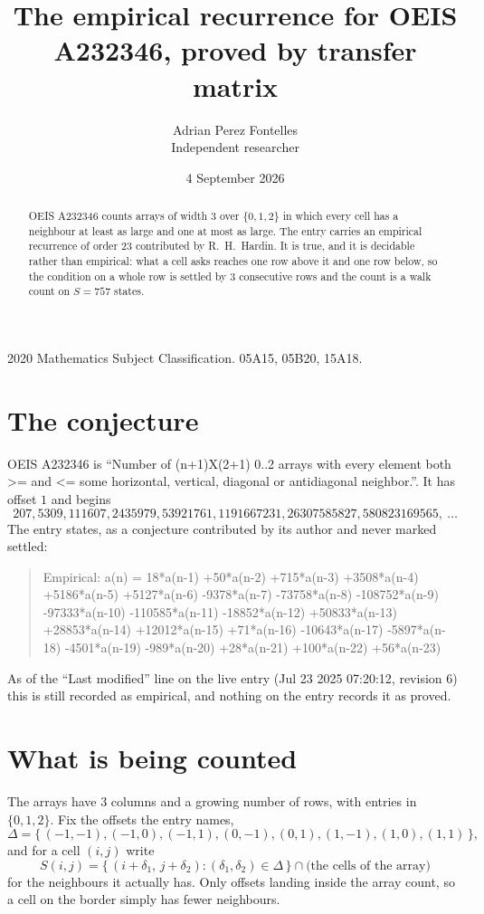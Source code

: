 \documentclass[11pt,a4paper]{article}
\title{The empirical recurrence for OEIS A232346, proved by transfer matrix}
\author{Adrian Perez Fontelles\\ \small Independent researcher}
\date{4 September 2026}
\theoremstyle{plain}
\theoremstyle{definition}
\begin{document}
\maketitle

\begin{abstract}
OEIS A232346 counts arrays of width $3$ over $\{0,1,2\}$ in which every cell has a neighbour at least as large and one at most as large. The entry carries an
empirical recurrence of order $23$ contributed by R.~H.~Hardin. It is true, and it is
decidable rather than empirical: what a cell asks reaches one row above it and one row below, so the
condition on a whole row is settled by $3$ consecutive rows and the count is a walk
count on $S=757$ states.
\end{abstract}

\noindent\small 2020 Mathematics Subject Classification. 05A15, 05B20, 15A18.\normalsize

\section{The conjecture}

OEIS A232346 is ``Number of (n+1)X(2+1) 0..2 arrays with every element both >= and <= some horizontal, vertical, diagonal or antidiagonal neighbor.''. It has offset $1$ and begins
\[
207, 5309, 111607, 2435979, 53921761, 1191667231, 26307585827, 580823169565,\ \dots
\]
The entry states, as a conjecture contributed by its author and never marked settled:
\begin{quote}
Empirical: a(n) = 18*a(n-1) +50*a(n-2) +715*a(n-3) +3508*a(n-4) +5186*a(n-5) +5127*a(n-6) -9378*a(n-7) -73758*a(n-8) -108752*a(n-9) -97333*a(n-10) -110585*a(n-11) -18852*a(n-12) +50833*a(n-13) +28853*a(n-14) +12012*a(n-15) +71*a(n-16) -10643*a(n-17) -5897*a(n-18) -4501*a(n-19) -989*a(n-20) +28*a(n-21) +100*a(n-22) +56*a(n-23)
\end{quote}
As of the ``Last modified'' line on the live entry (Jul 23 2025 07:20:12, revision 6) this is still
recorded as empirical, and nothing on the entry records it as proved.

\section{What is being counted}

The arrays have $3$ columns and a growing number of rows, with entries in $\{0,1,2\}$. Fix the
offsets the entry names,
\[
\Delta=\{\,(-1,-1), (-1,0), (-1,1), (0,-1), (0,1), (1,-1), (1,0), (1,1)\,\},
\]
and for a cell $(i,j)$ write
\[
S(i,j)=\{\,(i+\delta_1,\,j+\delta_2) : (\delta_1,\delta_2)\in\Delta\,\}\cap
\text{(the cells of the array)}
\]
for the neighbours it actually has. Only offsets landing inside the array count, so a cell on
the border simply has fewer neighbours.
\end{document}
